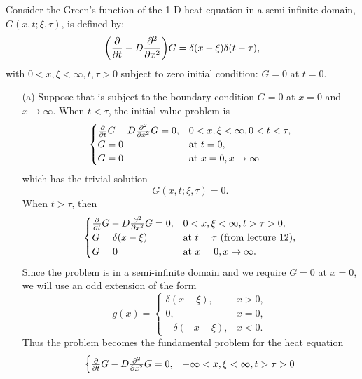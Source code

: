 \documentclass[12pt]{report}
\begin{document}
\begin{solution}
    
    \noindent
    Consider the Green's function of the 1-D heat equation in a semi-infinite domain, $G(x,t;\xi,\tau)$, is defined by:
    \begin{equation}\label{1-D heat}
        {\left(\frac{\partial }{\partial t} - D\frac{\partial^{2} }{\partial x^{2}}\right)}G = \delta(x - \xi)\delta(t - \tau),
    \end{equation}
    with $0<x,\xi<\infty, t,\tau>0$ subject to zero initial condition: $G=0$ at $t=0$.
    \begin{enumerate}
        \item [(a)]
        Suppose that  is subject to the boundary condition $G = 0$ at $x=0$ and $x\to\infty$. When $t < \tau$, the initial value problem is 
        \begin{align*}
            \begin{cases}
                \frac{\partial }{\partial t}G - D\frac{\partial^{2} }{\partial x^{2}}G = 0, &0<x,\xi<\infty, 0 < t < \tau,\\
                G=0 &\text{at}~ t = 0,\\
                G=0 &\text{at}~ x=0,x\to\infty
            \end{cases}
        \end{align*}
        which has the trivial solution
        \[
            G(x,t;\xi,\tau) = 0.
        \]
        When $t > \tau$, then 
        \[  
            \begin{cases}
                \frac{\partial }{\partial t}G - D\frac{\partial^{2} }{\partial x^{2}}G = 0, &0<x,\xi<\infty, t > \tau>0,\\
                G=\delta(x-\xi) &\text{at}~ t = \tau ~(\text{from lecture 12}),\\
                G=0 &\text{at}~ x=0,x\to\infty.
            \end{cases}
        \]
        Since the problem is in a semi-infinite domain and we require $G=0$ at $x=0$, we will use an odd extension of the form
        \[ 
            g(x) = \begin{cases}
                \delta(x - \xi), & x>0,\\
                0, & x=0,\\
                -\delta(-x -\xi), & x<0.
            \end{cases}
        \]
        Thus the problem becomes the fundamental problem for the heat equation
        \[
            \begin{cases}
                \frac{\partial }{\partial t}G - D\frac{\partial^{2} }{\partial x^{2}}G = 0, & -\infty<x,\xi<\infty, t>\tau>0\\

\end{cases}\]
\end{enumerate}
\end{solution}
\end{document}
